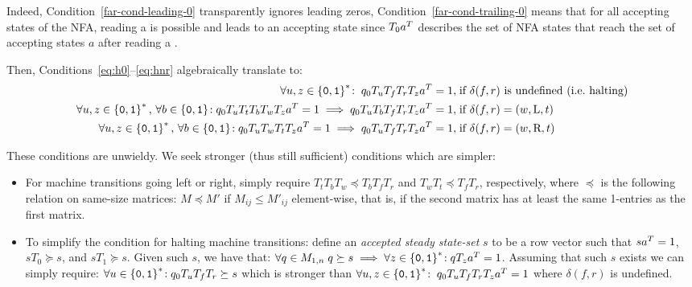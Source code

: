 Indeed, Condition~\eqref{far-cond-leading-0} transparently ignores leading zeros, Condition~\eqref{far-cond-trailing-0} means that for all accepting states of the NFA, reading a \szero is possible and leads to an accepting state since $T_0 a^{T}$ describes the set of NFA states that reach the set of accepting states $a$ after reading a \szero.

Then, Conditions~\eqref{eq:h0}--\eqref{eq:hnr} algebraically translate to:
{\small
\begin{align*}
    \forall u,z\in\left\{\texttt{0},\texttt{1}\right\}^*\!: \; q_0 T_u T_f T_r T_z a^{T} = 1, \;                                                                             & \text{if $\delta(f,r)$ is undefined (i.e.~halting)}
    \\
    \forall u,z\in\left\{\texttt{0},\texttt{1}\right\}^*,\,\forall b \in \left\{\texttt{0},\texttt{1}\right\}\!: q_0 T_{u} T_t T_b T_w T_{z} a^{T} = 1 \implies q_0 T_{u} T_b T_f T_r T_{z} a^{T} = 1,\; & \text{if $\delta(f,r) = (w,\text{L},t)$}
    \\
    \forall u,z\in\left\{\texttt{0},\texttt{1}\right\}^*,\,\forall b \in \left\{\texttt{0},\texttt{1}\right\}\!: q_0 T_{u} T_w T_t T_{z} a^{T} = 1 \implies q_0 T_{u} T_f T_r T_{z} a^{T} = 1,\;         & \text{if $\delta(f,r) = (w,\text{R},t)$}
\end{align*}
}

These conditions are unwieldy. We seek stronger (thus still sufficient) conditions which are simpler:

\begin{itemize}

    \item For machine transitions going left or right, simply require $T_t T_b T_w\preceq T_b T_f T_r$ and $T_w T_t\preceq T_f T_r$, respectively, where $\preceq$ is the following relation on same-size matrices: $M\preceq M'$ if $M_{ij}\le M'_{ij}$ element-wise, that is, if the second matrix has at least the same 1-entries as the first matrix.

    \item To simplify the condition for halting machine transitions: define an \emph{accepted steady state-set} $s$ to be a row vector such that $sa^{T} = 1$, $s T_0\succeq s$, and $s T_1\succeq s$. Given such $s$, we have that: $\forall q\in M_{1,n}\; q \succeq s\implies \forall z\in\left\{\texttt{0},\texttt{1}\right\}^*\!: qT_{z}a^{T} = 1$. Assuming that such $s$ exists we can simply require: $\forall u\in\left\{\texttt{0},\texttt{1}\right\}^*\!: q_0T_u T_f T_r \succeq s$ which is stronger than $\forall u,z\in\left\{\texttt{0},\texttt{1}\right\}^*\!: \; q_0 T_u T_f T_r T_z a^{T} = 1$ where $\delta(f,r)$ is undefined.



\end{itemize}

